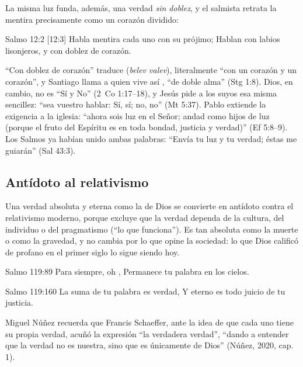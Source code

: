 La misma luz funda, además, una verdad \emph{sin doblez}, y el salmista retrata la mentira precisamente como un corazón dividido:

\begin{verso}{Salmo 12:2 [12:3]}
Habla mentira cada uno con su prójimo; Hablan con labios lisonjeros, y con doblez de corazón.
\end{verso}

``Con doblez de corazón'' traduce  (\emph{belev valev}), literalmente ``con un corazón y un corazón'', y Santiago llama a quien vive así , ``de doble alma'' (Stg 1:8). Dios, en cambio, no es ``Sí y No'' (2~Co 1:17--18), y Jesús pide a los suyos esa misma sencillez: ``sea vuestro hablar: Sí, sí; no, no'' (Mt 5:37). Pablo extiende la exigencia a la iglesia: ``ahora sois luz en el Señor; andad como hijos de luz (porque el fruto del Espíritu es en toda bondad, justicia y verdad)'' (Ef 5:8--9). Los Salmos ya habían unido ambas palabras: ``Envía tu luz y tu verdad; éstas me guiarán'' (Sal 43:3).


\subsection{Antídoto al relativismo}
Una verdad absoluta y eterna como la de Dios se convierte en antídoto contra el relativismo moderno, porque excluye que la verdad dependa de la cultura, del individuo o del pragmatismo (``lo que funciona''). Es tan absoluta como la muerte o como la gravedad, y no cambia por lo que opine la sociedad: lo que Dios calificó de profano en el primer siglo lo sigue siendo hoy.

\begin{verso}{Salmo 119:89}
Para siempre, oh \SENOR{}, Permanece tu palabra en los cielos.
\end{verso}
\begin{verso}{Salmo 119:160}
La suma de tu palabra es verdad, Y eterno es todo juicio de tu justicia.
\end{verso}

Miguel Núñez recuerda que Francis Schaeffer, ante la idea de que cada uno tiene su propia verdad, acuñó la expresión ``la verdadera verdad'', ``dando a entender que la verdad no es nuestra, sino que es únicamente de Dios'' (Núñez, 2020, cap. 1).

